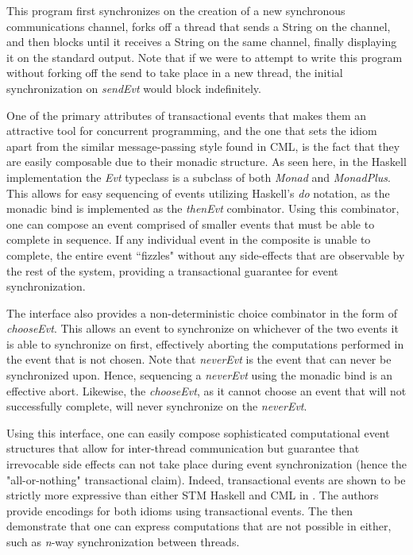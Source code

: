 \documentclass[conference, letterpaper]{IEEEtran}
\begin{document}
This program first synchronizes on the creation of a new synchronous communications channel, forks off a thread that sends a String on the channel, and then blocks until it receives a String on the same channel, finally displaying it on the standard output. Note that if we were to attempt to write this program without forking off the send to take place in a new thread, the initial synchronization on \textit{sendEvt} would block indefinitely.

One of the primary attributes of transactional events that makes them an attractive tool for concurrent programming, and the one that sets the idiom apart from the similar message-passing style found in CML, is the fact that they are easily composable due to their monadic structure. As seen here, in the Haskell implementation the \textit{Evt} typeclass is a subclass of both \textit{Monad} and \textit{MonadPlus}. This allows for easy sequencing of events utilizing Haskell's \textit{do} notation, as the monadic bind is implemented as the \textit{thenEvt} combinator. Using this combinator, one can compose an event comprised of smaller events that must be able to complete in sequence. If any individual event in the composite is unable to complete, the entire event ``fizzles" without any side-effects that are observable by the rest of the system, providing a transactional guarantee for event synchronization.

The interface also provides a non-deterministic choice combinator in the form of \textit{chooseEvt}. This allows an event to synchronize on whichever of the two events it is able to synchronize on first, effectively aborting the computations performed in the event that is not chosen. Note that \textit{neverEvt} is the event that can never be synchronized upon. Hence, sequencing a \textit{neverEvt} using the monadic bind is an effective abort. Likewise, the \textit{chooseEvt}, as it cannot choose an event that will not successfully complete, will never synchronize on the \textit{neverEvt}.

Using this interface, one can easily compose sophisticated computational event structures that allow for inter-thread communication but guarantee that irrevocable side effects can not take place during event synchronization (hence the "all-or-nothing" transactional claim). Indeed, transactional events are shown to be strictly more expressive than either STM Haskell and CML in \cite{te:original}. The authors provide encodings for both idioms using transactional events. The then demonstrate that one can express computations that are not possible in either, such as \textit{n}-way synchronization between threads.
\end{document}
